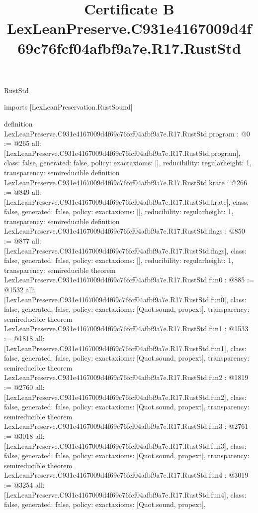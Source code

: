 \begin{lexlean}{RustStd}
\title{Certificate B LexLeanPreserve.C931e4167009d4f69c76fcf04afbf9a7e.R17.RustStd}
\begin{coremodule}
imports [LexLeanPreservation.RustSound]

definition LexLeanPreserve.C931e4167009d4f69c76fcf04afbf9a7e.R17.RustStd.program : @0 := @265 {
  all: [LexLeanPreserve.C931e4167009d4f69c76fcf04afbf9a7e.R17.RustStd.program],
  class: false,
  generated: false,
  policy: exact{axioms: []},
  reducibility: regular{height: 1},
  transparency: semireducible
}
definition LexLeanPreserve.C931e4167009d4f69c76fcf04afbf9a7e.R17.RustStd.krate : @266 := @849 {
  all: [LexLeanPreserve.C931e4167009d4f69c76fcf04afbf9a7e.R17.RustStd.krate],
  class: false,
  generated: false,
  policy: exact{axioms: []},
  reducibility: regular{height: 1},
  transparency: semireducible
}
definition LexLeanPreserve.C931e4167009d4f69c76fcf04afbf9a7e.R17.RustStd.flags : @850 := @877 {
  all: [LexLeanPreserve.C931e4167009d4f69c76fcf04afbf9a7e.R17.RustStd.flags],
  class: false,
  generated: false,
  policy: exact{axioms: []},
  reducibility: regular{height: 1},
  transparency: semireducible
}
theorem LexLeanPreserve.C931e4167009d4f69c76fcf04afbf9a7e.R17.RustStd.fun0 : @885 := @1532 {
  all: [LexLeanPreserve.C931e4167009d4f69c76fcf04afbf9a7e.R17.RustStd.fun0],
  class: false,
  generated: false,
  policy: exact{axioms: [Quot.sound, propext]},
  transparency: semireducible
}
theorem LexLeanPreserve.C931e4167009d4f69c76fcf04afbf9a7e.R17.RustStd.fun1 : @1533 := @1818 {
  all: [LexLeanPreserve.C931e4167009d4f69c76fcf04afbf9a7e.R17.RustStd.fun1],
  class: false,
  generated: false,
  policy: exact{axioms: [Quot.sound, propext]},
  transparency: semireducible
}
theorem LexLeanPreserve.C931e4167009d4f69c76fcf04afbf9a7e.R17.RustStd.fun2 : @1819 := @2760 {
  all: [LexLeanPreserve.C931e4167009d4f69c76fcf04afbf9a7e.R17.RustStd.fun2],
  class: false,
  generated: false,
  policy: exact{axioms: [Quot.sound, propext]},
  transparency: semireducible
}
theorem LexLeanPreserve.C931e4167009d4f69c76fcf04afbf9a7e.R17.RustStd.fun3 : @2761 := @3018 {
  all: [LexLeanPreserve.C931e4167009d4f69c76fcf04afbf9a7e.R17.RustStd.fun3],
  class: false,
  generated: false,
  policy: exact{axioms: [Quot.sound, propext]},
  transparency: semireducible
}
theorem LexLeanPreserve.C931e4167009d4f69c76fcf04afbf9a7e.R17.RustStd.fun4 : @3019 := @3254 {
  all: [LexLeanPreserve.C931e4167009d4f69c76fcf04afbf9a7e.R17.RustStd.fun4],
  class: false,
  generated: false,
  policy: exact{axioms: [Quot.sound, propext]},
}
\end{coremodule}
\end{lexlean}
